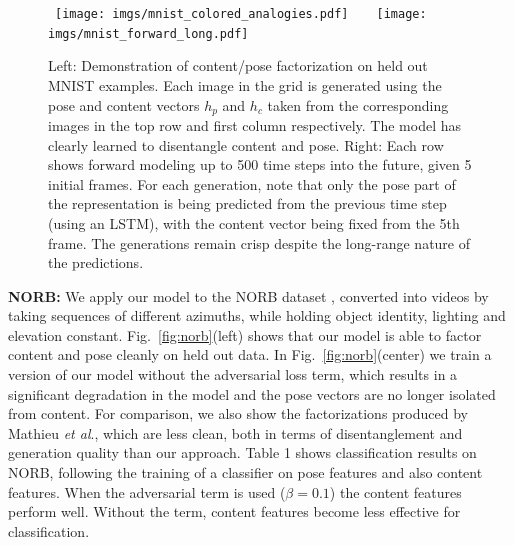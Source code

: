\documentclass{article}
\newcommand{\fig}[1]{Fig.~\ref{fig:#1}}
\newcommand{\rulesep}{\unskip\ \vrule\ }
\newcommand{\etal}{\textit{et al}.\:}
\begin{document}
\begin{figure}[b!]
\mbox{
\texttt{[image: imgs/mnist\_colored\_analogies.pdf]}
\rulesep
\texttt{[image: imgs/mnist\_forward\_long.pdf]}
}
\caption{Left: Demonstration of content/pose factorization on held out MNIST
  examples. Each image in the grid is
   generated using the pose and content vectors $h_p$ and $h_c$ taken
   from the corresponding images in the top row and first column
   respectively. The model has clearly
  learned to disentangle content and pose. Right: Each row shows
  forward modeling up to 500 time steps into the future, given 5
  initial frames. For each generation, note that only the pose
  part of the representation is being predicted from the previous time
  step (using an LSTM), with
  the content vector being fixed from the 5th frame. The
  generations remain crisp despite the long-range nature of
  the predictions. 
} \label{fig:mnist}
\end{figure}{\bf NORB:} We apply our model to the NORB dataset \cite{norb}, converted into videos by taking sequences of different azimuths, while holding
object identity, lighting and elevation constant. \fig{norb}(left) shows
that our model is able to factor content and pose cleanly on held out
data. In \fig{norb}(center) we train a version of our model without
the adversarial loss term, which results in a significant
degradation in the model and the pose vectors are no longer isolated
from content. For comparison, we also show the factorizations produced
by Mathieu \etal\cite{mathieu2016}, which are less clean, both in
terms of disentanglement and generation quality than our
approach. Table 1 shows classification results on NORB, following the
training of a classifier on pose features and also content
features. When the adversarial term is used ($\beta=0.1$) the content
features perform well. Without the term, content features become less
effective for classification.    
\end{document}
